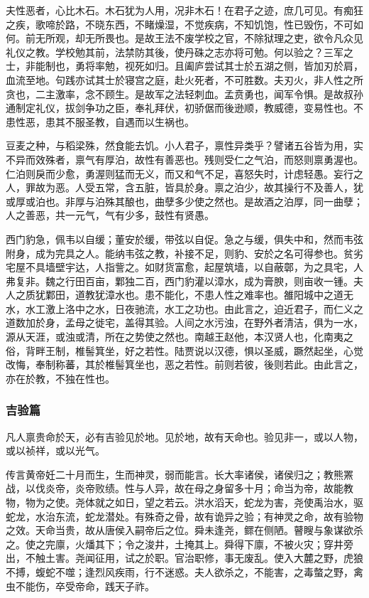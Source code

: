 \documentclass[]{article}
\begin{document}
夫性恶者，心比木石。木石犹为人用，况非木石！在君子之迹，庶几可见。有痴狂之疾，歌啼於路，不晓东西，不睹燥湿，不觉疾病，不知饥饱，性已毁伤，不可如何。前无所观，却无所畏也。是故王法不废学校之官，不除狱理之吏，欲令凡众见礼仪之教。学校勉其前，法禁防其後，使丹硃之志亦将可勉。何以验之？三军之士，非能制也，勇将率勉，视死如归。且阖庐尝试其士於五湖之侧，皆加刃於肩，血流至地。句践亦试其士於寝宫之庭，赴火死者，不可胜数。夫刃火，非人性之所贪也，二主激率，念不顾生。是故军之法轻刺血。孟贲勇也，闻军令惧。是故叔孙通制定礼仪，拔剑争功之臣，奉礼拜伏，初骄倨而後逊顺，教威德，变易性也。不患性恶，患其不服圣教，自遇而以生祸也。

豆麦之种，与稻梁殊，然食能去饥。小人君子，禀性异类乎？譬诸五谷皆为用，实不异而效殊者，禀气有厚泊，故性有善恶也。残则受仁之气泊，而怒则禀勇渥也。仁泊则戾而少愈，勇渥则猛而无义，而又和气不足，喜怒失时，计虑轻愚。妄行之人，罪故为恶。人受五常，含五脏，皆具於身。禀之泊少，故其操行不及善人，犹或厚或泊也。非厚与泊殊其酿也，曲孽多少使之然也。是故酒之泊厚，同一曲孽；人之善恶，共一元气，气有少多，鼓性有贤愚。

西门豹急，佩韦以自缓；董安於缓，带弦以自促。急之与缓，俱失中和，然而韦弦附身，成为完具之人。能纳韦弦之教，补接不足，则豹、安於之名可得参也。贫劣宅屋不具墙壁宇达，人指訾之。如财货富愈，起屋筑墙，以自蔽鄣，为之具宅，人弗复非。魏之行田百亩，鄴独二百，西门豹灌以漳水，成为膏腴，则亩收一锺。夫人之质犹鄴田，道教犹漳水也。患不能化，不患人性之难率也。雒阳城中之道无水，水工激上洛中之水，日夜驰流，水工之功也。由此言之，迫近君子，而仁义之道数加於身，孟母之徙宅，盖得其验。人间之水污浊，在野外者清洁，俱为一水，源从天涯，或浊或清，所在之势使之然也。南越王赵他，本汉贤人也，化南夷之俗，背畔王制，椎髻箕坐，好之若性。陆贾说以汉德，惧以圣威，蹶然起坐，心觉改悔，奉制称蕃，其於椎髻箕坐也，恶之若性。前则若彼，後则若此。由此言之，亦在於教，不独在性也。

\hypertarget{header-n90}{%
\subsubsection{吉验篇}\label{header-n90}}

凡人禀贵命於天，必有吉验见於地。见於地，故有天命也。验见非一，或以人物，或以祯祥，或以光气。

传言黄帝妊二十月而生，生而神灵，弱而能言。长大率诸侯，诸侯归之；教熊罴战，以伐炎帝，炎帝败绩。性与人异，故在母之身留多十月；命当为帝，故能教物，物为之使。尧体就之如日，望之若云。洪水滔天，蛇龙为害，尧使禹治水，驱蛇龙，水治东流，蛇龙潜处。有殊奇之骨，故有诡异之验；有神灵之命，故有验物之效。天命当贵，故从唐侯入嗣帝后之位。舜未逢尧，鳏在侧陋。瞽瞍与象谋欲杀之。使之完廪，火燔其下；令之浚井，土掩其上。舜得下廪，不被火灾；穿井旁出，不触土害。尧闻征用，试之於职。官治职修，事无废乱。使入大麓之野，虎狼不搏，蝮蛇不噬；逢烈风疾雨，行不迷惑。夫人欲杀之，不能害，之毒螫之野，禽虫不能伤，卒受帝命，践天子祚。
\end{document}
